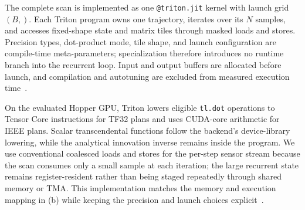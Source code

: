 The complete scan is implemented as one \texttt{@triton.jit} kernel with launch grid $(B,)$. Each Triton program owns one trajectory, iterates over its $N$ samples, and accesses fixed-shape state and matrix tiles through masked loads and stores. Precision types, dot-product mode, tile shape, and launch configuration are compile-time meta-parameters; specialization therefore introduces no runtime branch into the recurrent loop. Input and output buffers are allocated before launch, and compilation and autotuning are excluded from measured execution time~\cite{triton}.

On the evaluated Hopper GPU, Triton lowers eligible \texttt{tl.dot} operations to Tensor Core instructions for TF32 plans and uses CUDA-core arithmetic for IEEE plans. Scalar transcendental functions follow the backend's device-library lowering, while the analytical innovation inverse remains inside the program. We use conventional coalesced loads and stores for the per-step sensor stream because the scan consumes only a small sample at each iteration; the large recurrent state remains register-resident rather than being staged repeatedly through shared memory or TMA. This implementation matches the memory and execution mapping in (b) while keeping the precision and launch choices explicit~\cite{nvidia2022hopper}.
